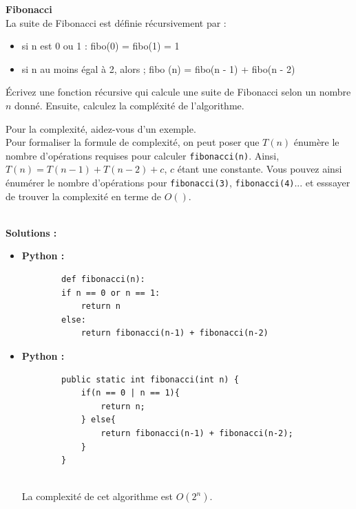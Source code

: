 \begin{Exercice} [10 minutes] \textbf{Fibonacci} \\

La suite de Fibonacci est définie récursivement par :
\begin{itemize}
    \item si n est 0 ou 1 : fibo(0) = fibo(1) = 1
    \item si n au moins égal à 2, alors ; fibo (n) = fibo(n - 1) + fibo(n - 2)
\end{itemize}

Écrivez une fonction récursive qui calcule une suite de Fibonacci selon un nombre $n$ donné. Ensuite, calculez la compléxité de l'algorithme.

\begin{conseil}
Pour la complexité, aidez-vous d'un exemple. \\
Pour formaliser la formule de complexité, on peut poser que $T(n)$ énumère le nombre d'opérations requises pour calculer \lstinline{fibonacci(n)}. Ainsi, $T(n) = T(n-1) + T(n-2) + c$, $c$ étant une constante. Vous pouvez ainsi énumérer le nombre d'opérations pour \lstinline{fibonacci(3)}, \lstinline{fibonacci(4)}... et esssayer de trouver la complexité en terme de $O()$.
\end{conseil}
\ \\

\textbf{Solutions :}
\begin{itemize}
    \item \textbf{Python :}
    \begin{verbatim}
        def fibonacci(n):
        if n == 0 or n == 1:
            return n
        else:
            return fibonacci(n-1) + fibonacci(n-2)
    \end{verbatim}
    
    \item \textbf{Python :}
    \begin{verbatim}
        public static int fibonacci(int n) {
            if(n == 0 | n == 1){
                return n;
            } else{
                return fibonacci(n-1) + fibonacci(n-2);
            }
        }
        
    \end{verbatim}
    
    La complexité de cet algorithme est $O(2^n)$.
    
\end{itemize}

\end{Exercice}

